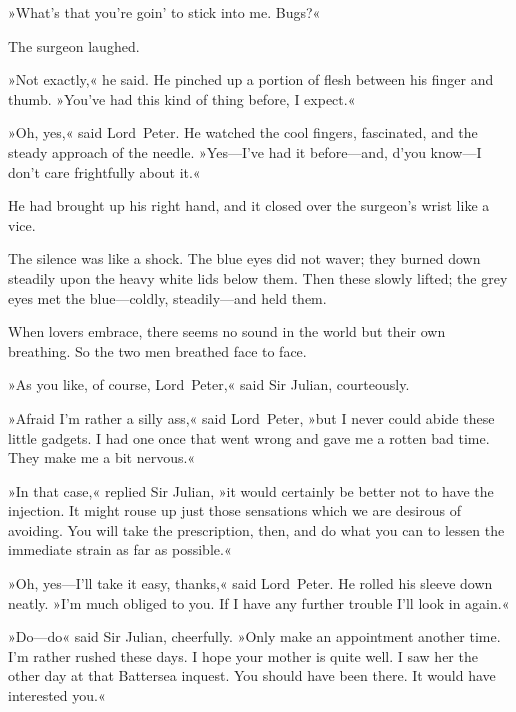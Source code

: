 »What's that you're goin' to stick into me. Bugs?«

The surgeon laughed.

»Not exactly,« he said. He pinched up a portion of flesh between his finger and thumb. »You've had this kind of thing before, I expect.«

»Oh, yes,« said Lord~Peter. He watched the cool fingers, fascinated, and the steady approach of the needle. »Yes—I've had it before—and, d'you know—I don't care frightfully about it.«

He had brought up his right hand, and it closed over the surgeon's wrist like a vice.

The silence was like a shock. The blue eyes did not waver; they burned down steadily upon the heavy white lids below them. Then these slowly lifted; the grey eyes met the blue—coldly, steadily—and held them.

When lovers embrace, there seems no sound in the world but their own breathing. So the two men breathed face to face.

»As you like, of course, Lord~Peter,« said Sir Julian, courteously.

»Afraid I'm rather a silly ass,« said Lord~Peter, »but I never could abide these little gadgets. I had one once that went wrong and gave me a rotten bad time. They make me a bit nervous.«

»In that case,« replied Sir Julian, »it would certainly be better not to have the injection. It might rouse up just those sensations which we are desirous of avoiding. You will take the prescription, then, and do what you can to lessen the immediate strain as far as possible.«

»Oh, yes—I'll take it easy, thanks,« said Lord~Peter. He rolled his sleeve down neatly. »I'm much obliged to you. If I have any further trouble I'll look in again.«

»Do—do\longdash« said Sir Julian, cheerfully. »Only make an appointment another time. I'm rather rushed these days. I hope your mother is quite well. I saw her the other day at that Battersea inquest. You should have been there. It would have interested you.«